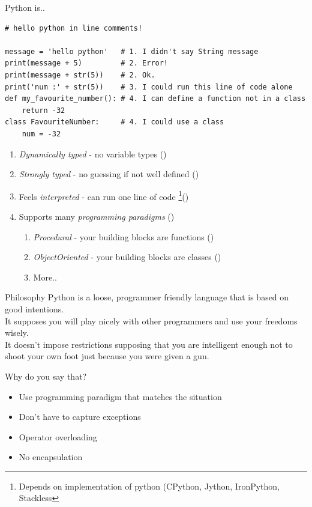 \documentclass{bredelebeamer}
\begin{document}
\begin{frame}[fragile]{Python is..}

\begin{lstlisting}
# hello python in line comments!

message = 'hello python'   # 1. I didn't say String message
print(message + 5)         # 2. Error!
print(message + str(5))    # 2. Ok.
print('num :' + str(5))    # 3. I could run this line of code alone
def my_favourite_number(): # 4. I can define a function not in a class
    return -32
class FavouriteNumber:     # 4. I could use a class
    num = -32
\end{lstlisting}

\begin{enumerate}
  \item \emph{Dynamically typed} - no variable types ()
  \item \emph{Strongly typed} - no guessing if not well defined ()
  \item Feels \emph{interpreted} - can run one line of code \footnote{Depends on implementation of python (CPython, Jython, IronPython, Stackless}()
  \item Supports many \emph{programming paradigms} ()
  \begin{enumerate}
    \item \emph{Procedural} - your building blocks are functions ()
    \item \emph{ObjectOriented} - your building blocks are classes ()
    \item More..
  \end{enumerate}
\end{enumerate}

\end{frame}

\begin{frame}{Philosophy}
  Python is a loose, programmer friendly language that is based on good intentions. \\
  It supposes you will play nicely with other programmers and use your freedoms wisely.\\
  It doesn't impose restrictions supposing that you are intelligent enough not to shoot
  your own foot just because you were given a gun.\\
  
  \begin{block}{Why do you say that?}
  \begin{itemize}
    \item Use programming paradigm that matches the situation
    \item Don't have to capture exceptions
    \item Operator overloading
    \item No encapsulation
  \end{itemize}
  \end{block}
\end{frame}
\end{document}
